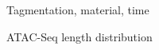 \documentclass{beamer}
\begin{document}
\begin{frame}{Tagmentation, material, time}
\end{frame}

\begin{frame}{ATAC-Seq length distribution}
\end{frame}
\end{document}

